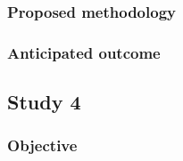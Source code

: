 \begin{itemize}

\subsubsection{Proposed methodology} 
\label{sec:method1}




\subsubsection{Anticipated outcome}


\subsection{Study 4}
\label{sec:study4}

\subsubsection{Objective} 



\end{itemize}
